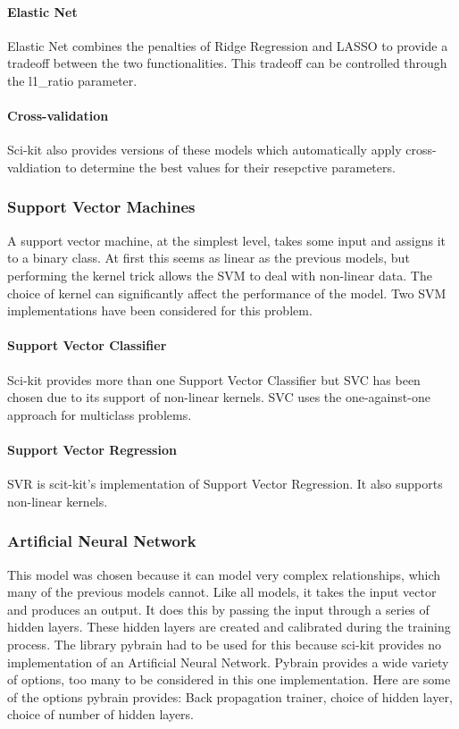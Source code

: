 \paragraph{Elastic Net}
Elastic Net combines the penalties of Ridge Regression and LASSO to provide a tradeoff between the two functionalities. This tradeoff can be controlled through the l1\_ratio parameter.

\paragraph{Cross-validation}
Sci-kit also provides versions of these models which automatically apply cross-valdiation to determine the best values for their resepctive parameters.

\subsubsection{Support Vector Machines}
A support vector machine, at the simplest level, takes some input and assigns it to a binary class. At first this seems as linear as the previous models, but performing the kernel trick allows the SVM to deal with non-linear data. The choice of kernel can significantly affect the performance of the model. Two SVM implementations have been considered for this problem.

\paragraph{Support Vector Classifier}
Sci-kit provides more than one Support Vector Classifier but SVC has been chosen due to its support of non-linear kernels. SVC uses the one-against-one approach for multiclass problems.

\paragraph{Support Vector Regression}
SVR is scit-kit's implementation of Support Vector Regression. It also supports non-linear kernels.

\subsubsection{Artificial Neural Network}
This model was chosen because it can model very complex relationships, which many of the previous models cannot. Like all models, it takes the input vector and produces an output. It does this by passing the input through a series of hidden layers. These hidden layers are created and calibrated during the training process. The library pybrain had to be used for this because sci-kit provides no implementation of an Artificial Neural Network.
Pybrain provides a wide variety of options, too many to be considered in this one implementation. Here are some of the options pybrain provides: Back propagation trainer, choice of hidden layer, choice of number of hidden layers.


